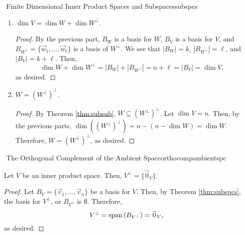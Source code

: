 \begin{theorem}{\Stop\,\,Finite Dimensional Inner Product Spaces and Subspaces}{subspcs}
\begin{enumerate}
\begin{proof}
\begin{equation*}
                    \end{equation*} 
                    meaning that \(\vec{s}\in\Span(\{\vec{w}_1,\ldots,\vec{w}_\ell\})\), or equivalently, \(\vec{s}\in S\), so \(W^\perp\subseteq S\), as desired.
                \end{proof}
                \item \(\dim V=\dim W+\dim W^\perp\).
                \begin{proof}
                    By the previous part, \(B_W\) is a basis for \(W\), \(B_V\) is a basis for \(V\), and \(B_{W^\perp}=\{\vec{w}_1,\ldots,\vec{w}_\ell\}\) is a basis of \(W^\perp\). We see that \(|B_W|=k\), \(|B_{W^\perp}|=\ell\), and \(|B_V|=k+\ell\). Then,
                    \begin{equation*}
                        \dim W+\dim W^\perp=|B_W|+|B_{W^\perp}|=n+\ell=|B_V|=\dim V,
                    \end{equation*}
                    as desired.
                \end{proof}
                \item \(W=(W^\perp)^\perp\).
                \begin{proof}
                    By Theorem \ref{thm:subsub}, \(W\subseteq (W^\perp)^\perp\). Let \(\dim V=n\). Then, by the previous parts, \(\dim ((W^\perp)^\perp)=n-(n-\dim W)=\dim W\). Therefore, \(W=(W^\perp)^\perp\), as desired.
                \end{proof}
            \end{enumerate}

        \end{theorem}
        \pagebreak
        \begin{theorem}{\Stop\,\,The Orthogonal Complement of the Ambient Space}{orthocompambientspc}

            Let \(V\) be an inner product space. Then, \(V^\perp=\{\vec{0}_V\}\).
            \begin{proof}
                Let \(B_V=\{\vec{v}_1,\ldots,\vec{v}_n\}\) be a basis for \(V\). Then, by Theorem \ref{thm:subspcs}, the basis for \(V^\perp\), or \(B_{V^\perp}\) is \(\emptyset\). Therefore,
                \begin{equation*}
                    V^\perp=\text{span\,}(B_{V^\perp})=\overset{_{\rightharpoonup}}{0}_V,
                \end{equation*}
                as desired.
            \end{proof}
            
        \end{theorem}
